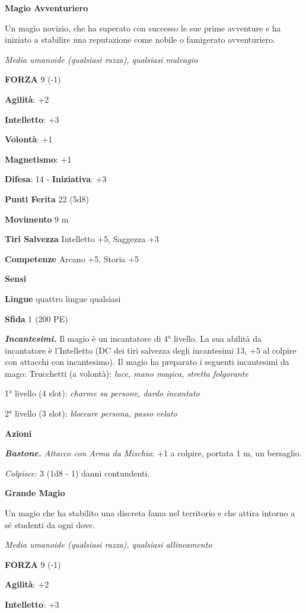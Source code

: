 \begin{multicols}{2}
\textbf{Magio Avventuriero}

Un magio novizio, che ha superato con successo le sue prime avventure e
ha iniziato a stabilire una reputazione come nobile o famigerato
avventuriero.

\emph{Media umanoide (qualsiasi razza), qualsiasi malvagio}

\textbf{FORZA} 9 (-1)

\textbf{Agilità}: +2

\textbf{Intelletto}: +3

\textbf{Volontà}: +1

\textbf{Magnetismo}: +1

\textbf{Difesa}: 14 - \textbf{Iniziativa}: +3

\textbf{Punti Ferita} 22 (5d8)

\textbf{Movimento} 9 m

\textbf{Tiri Salvezza} Intelletto +5, Saggezza +3

\textbf{Competenze} Arcano +5, Storia +5

\textbf{Sensi} 

\textbf{Lingue} quattro lingue qualsiasi

\textbf{Sfida} 1 (200 PE)\smallskip

\emph{\textbf{Incantesimi.}} Il magio è un incantatore di 4° livello. La
sua abilità da incantatore è l'Intelletto (DC dei tiri salvezza degli
incantesimi 13, +5 al colpire con attacchi con incantesimo). Il magio ha
preparato i seguenti incantesimi da mago: Trucchetti (a volontà):
\emph{luce, mano magica, stretta folgorante}

1° livello (4 slot): \emph{charme su persone, dardo incantato}

2° livello (3 slot): \emph{bloccare persona, passo velato}

\smallskip\textbf{Azioni}

\emph{\textbf{Bastone.} Attacco con Arma da Mischia}: +1 a colpire,
portata 1 m, un bersaglio.

\emph{Colpisce:} 3 (1d8 - 1) danni contundenti.

\textbf{Grande Magio}

Un magio che ha stabilito una discreta fama nel territorio e che attira
intorno a sé studenti da ogni dove.

\emph{Media umanoide (qualsiasi razza), qualsiasi allineamento}

\textbf{FORZA} 9 (-1)

\textbf{Agilità}: +2

\textbf{Intelletto}: +3


\end{multicols}
